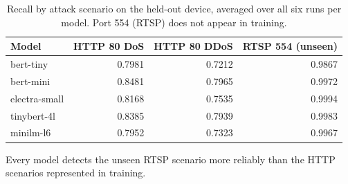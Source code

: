 \begin{table}[htbp]
\centering
\caption{Recall by attack scenario on the held-out device, averaged over all six runs per model. Port 554 (RTSP) does not appear in training.}
\label{tab:per-scenario}
\small
\begin{tabular}{lrrr}
\toprule
Model & HTTP 80 DoS & HTTP 80 DDoS & RTSP 554 (unseen) \\
\midrule
bert-tiny & 0.7981 & 0.7212 & 0.9867 \\
bert-mini & 0.8481 & 0.7965 & 0.9972 \\
electra-small & 0.8168 & 0.7535 & 0.9994 \\
tinybert-4l & 0.8385 & 0.7939 & 0.9983 \\
minilm-l6 & 0.7952 & 0.7323 & 0.9967 \\
\bottomrule
\end{tabular}
\vspace{2pt}
\footnotesize Every model detects the unseen RTSP scenario more reliably than the HTTP scenarios represented in training.
\end{table}

